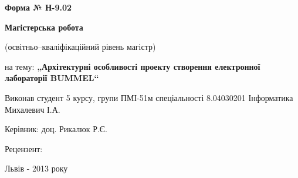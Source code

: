 \documentclass[12pt,a4paper]{article}
\begin{document}

\pagestyle{empty}
\setlength{\parindent}{1.5cm}
\fontsize{14pt}{6mm}\selectfont

\begin{flushright}
  {\bfseries\small Форма № Н-9.02}
\end{flushright}

\begin{center}

  \vspace{6cm}


    {\bfseries\Large Магістерська робота}

    {\small (освітньо--кваліфікаційний рівень магістр)}

    \bigskip

    на тему: {\bfseries\large „Архітектурні особливості проекту створення електронної лабораторії BUMMEL“}

\end{center}

\vspace{2cm}

\begin{small}
\begin{flushleft}
  Виконав студент 5 курсу, групи ПМІ-51м спеціальності 8.04030201 Інформатика\\
  Михалевич І.А.\linebreak

  Керівник: доц. Рикалюк Р.Є.\linebreak

  Рецензент: \underline{\hspace{3cm}}

\end{flushleft}
\end{small}

\vspace{5cm}

\begin{center}
  Львів - 2013 року
\end{center}

\clearpage
\end{document}
